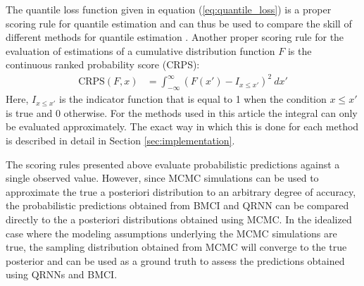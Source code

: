 \documentclass[journal abbreviation, manuscript]{copernicus}
\begin{document}
  The quantile loss function given in equation (\ref{eq:quantile_loss}) is a
  proper scoring rule for quantile estimation and can thus be used to compare
  the skill of different methods for quantile estimation \citep{gneiting}.
  Another proper scoring rule for the evaluation of estimations of a cumulative
  distribution function $F$ is the continuous ranked probability score (CRPS):
  \begin{align}\label{eq:crps}
    \text{CRPS}(F, x) &= \int_{-\infty}^{\infty} \left ( F(x') - I_{x \leq x'}
    \right )^2 \: dx'
  \end{align}
  Here, $I_{x \leq x'}$ is the indicator function that is equal to 1 when
  the condition $x \leq x'$ is true and $0$ otherwise.
  For the methods used in this article the integral can only be evaluated
  approximately. The exact way in which this is done for each method is
  described in detail in Section \ref{sec:implementation}.

  The scoring rules presented above evaluate probabilistic predictions against a
  single observed value. However, since MCMC simulations can be used to
  approximate the true a posteriori distribution to an arbitrary degree of
  accuracy, the probabilistic predictions obtained from BMCI and QRNN can be
  compared directly to the a posteriori distributions obtained using MCMC. In
  the idealized case where the modeling assumptions underlying the MCMC
  simulations are true, the sampling distribution obtained from MCMC will
  converge to the true posterior and can be used as a ground truth to assess the
  predictions obtained using QRNNs and BMCI.
\end{document}
